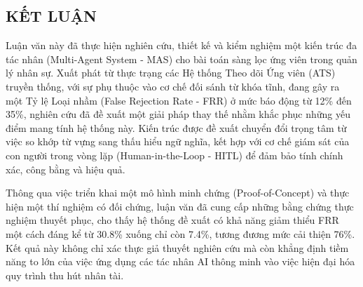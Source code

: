 \documentclass{article}
\begin{document}
\begin{itemize}[topsep=0pt, itemsep=4pt, leftmargin=40pt]
\section*{KẾT LUẬN}
Luận văn này đã thực hiện nghiên cứu, thiết kế và kiểm nghiệm một kiến trúc đa tác nhân (Multi-Agent System - MAS) cho bài toán sàng lọc ứng viên trong quản lý nhân sự. Xuất phát từ thực trạng các Hệ thống Theo dõi Ứng viên (ATS) truyền thống, với sự phụ thuộc vào cơ chế đối sánh từ khóa tĩnh, đang gây ra một Tỷ lệ Loại nhầm (False Rejection Rate - FRR) ở mức báo động từ 12\% đến 35\%, nghiên cứu đã đề xuất một giải pháp thay thế nhằm khắc phục những yếu điểm mang tính hệ thống này. Kiến trúc được đề xuất chuyển đổi trọng tâm từ việc so khớp từ vựng sang thấu hiểu ngữ nghĩa, kết hợp với cơ chế giám sát của con người trong vòng lặp (Human-in-the-Loop - HITL) để đảm bảo tính chính xác, công bằng và hiệu quả.

Thông qua việc triển khai một mô hình minh chứng (Proof-of-Concept) và thực hiện một thí nghiệm có đối chứng, luận văn đã cung cấp những bằng chứng thực nghiệm thuyết phục, cho thấy hệ thống đề xuất có khả năng giảm thiểu FRR một cách đáng kể từ 30.8\% xuống chỉ còn 7.4\%, tương đương mức cải thiện 76\%. Kết quả này không chỉ xác thực giả thuyết nghiên cứu mà còn khẳng định tiềm năng to lớn của việc ứng dụng các tác nhân AI thông minh vào việc hiện đại hóa quy trình thu hút nhân tài.


\end{itemize}
\end{document}
